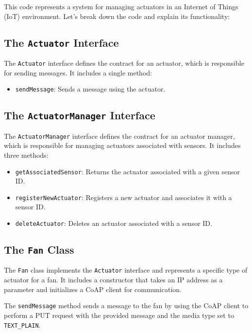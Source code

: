 \documentclass[parskip=full]{report}
\begin{document}
	

		

		
		This code represents a system for managing actuators in an Internet of Things (IoT) environment. Let's break down the code and explain its functionality:
		
		\subsection{The \texttt{Actuator} Interface}
		
		The \texttt{Actuator} interface defines the contract for an actuator, which is responsible for sending messages. It includes a single method:
		
		\begin{itemize}
			\item \texttt{sendMessage}: Sends a message using the actuator.
		\end{itemize}
		
		\subsection{The \texttt{ActuatorManager} Interface}
		
		The \texttt{ActuatorManager} interface defines the contract for an actuator manager, which is responsible for managing actuators associated with sensors. It includes three methods:
		
		\begin{itemize}
			\item \texttt{getAssociatedSensor}: Returns the actuator associated with a given sensor ID.
			\item \texttt{registerNewActuator}: Registers a new actuator and associates it with a sensor ID.
			\item \texttt{deleteActuator}: Deletes an actuator associated with a sensor ID.
		\end{itemize}
		
		\subsection{The \texttt{Fan} Class}
		
		The \texttt{Fan} class implements the \texttt{Actuator} interface and represents a specific type of actuator for a fan. It includes a constructor that takes an IP address as a parameter and initializes a CoAP client for communication.
		
		The \texttt{sendMessage} method sends a message to the fan by using the CoAP client to perform a PUT request with the provided message and the media type set to \texttt{TEXT\_PLAIN}.
		
\end{document}
